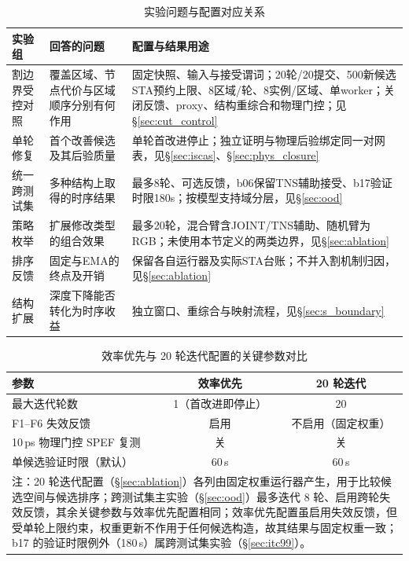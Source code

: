 \documentclass[twocolumn,10pt,fontset=windows]{ctexart}
\begin{document}
\begin{table}[!t]
\centering
\caption{实验问题与配置对应关系}\label{tab:experiment_map}
\footnotesize\setlength{\tabcolsep}{4pt}
\begin{tabular}{>{\raggedright\arraybackslash}p{2.0cm}>{\raggedright\arraybackslash}p{4.8cm}>{\raggedright\arraybackslash}p{8.4cm}}
\toprule
\textbf{实验组} & \textbf{回答的问题} & \textbf{配置与结果用途} \\
\midrule
割边界受控对照 & 覆盖区域、节点代价与区域顺序分别有何作用 & 固定快照、输入与接受谓词；20轮/20提交、500新候选STA预约上限、8区域/轮、8实例/区域、单worker；关闭反馈、proxy、结构重综合和物理门控；见\S\ref{sec:cut_control} \\
单轮修复 & 首个改善候选及其后验质量 & 单轮首改进停止；独立证明与物理后验绑定同一对网表，见\S\ref{sec:iscas}、\S\ref{sec:phys_closure} \\
统一跨测试集 & 多种结构上取得的时序结果 & 最多8轮、可选反馈，b06保留TNS辅助接受、b17验证时限180s；按模型支持域分层，见\S\ref{sec:ood} \\
策略枚举 & 扩展修改类型的组合效果 & 最多20轮，混合臂含JOINT/TNS辅助、随机臂为RGB；未使用本节定义的两类边界，见\S\ref{sec:ablation} \\
排序反馈 & 固定与EMA的终点及开销 & 保留各自运行器及实际STA台账；不并入割机制归因，见\S\ref{sec:ablation} \\
结构扩展 & 深度下降能否转化为时序收益 & 独立窗口、重综合与映射流程，见\S\ref{sec:s_boundary} \\
\bottomrule
\end{tabular}
\end{table}

\begin{table}[!htb]
\centering
\caption{效率优先与 20 轮迭代配置的关键参数对比}
\label{tab:configs}
\scriptsize
\setlength{\tabcolsep}{4pt}
\begin{tabular}{lcc}
\toprule
\textbf{参数} & \textbf{效率优先} & \textbf{20 轮迭代} \\
\midrule
最大迭代轮数                    & 1（首改进即停止） & 20 \\
F1--F6 失效反馈                  & 启用 & 不启用（固定权重） \\
10\,ps 物理门控 SPEF 复测        & 关 & 关 \\
单候选验证时限（默认）           & 60\,s & 60\,s \\
\bottomrule
\multicolumn{3}{p{0.95\columnwidth}}{\footnotesize 注：20 轮迭代配置（\S\ref{sec:ablation}）各列由固定权重运行器产生，用于比较候选空间与候选排序；跨测试集主实验（\S\ref{sec:ood}）最多迭代 8 轮、启用跨轮失效反馈，其余关键参数与效率优先配置相同；效率优先配置虽启用失效反馈，但受单轮上限约束，权重更新不作用于任何候选构造，故其结果与固定权重一致；b17 的验证时限例外（180\,s）属跨测试集实验（\S\ref{sec:itc99}）。}\\
\end{tabular}
\end{table}
\end{document}
